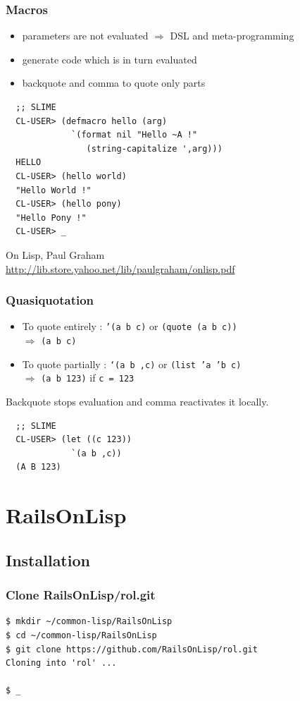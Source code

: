 \documentclass[8pt]{beamer}
\begin{document}
\begin{frame}[fragile]
  \frametitle{Macros}
  \begin{itemize}
    \item parameters are not evaluated $\Rightarrow$ DSL and meta-programming
    \item generate code which is in turn evaluated
    \item backquote and comma to quote only parts
  \end{itemize}
\begin{verbatim}
  ;; SLIME
  CL-USER> (defmacro hello (arg)
             `(format nil "Hello ~A !"
                (string-capitalize ',arg)))
  HELLO
  CL-USER> (hello world)
  "Hello World !"
  CL-USER> (hello pony)
  "Hello Pony !"
  CL-USER> _
\end{verbatim}
  \vspace{1em}
  On Lisp, Paul Graham \\
  \url{http://lib.store.yahoo.net/lib/paulgraham/onlisp.pdf}
\end{frame}

\begin{frame}[fragile]
  \frametitle{Quasiquotation}
  \begin{itemize}
  \item To quote entirely : {\tt '(a b c)} or {\tt (quote (a b c))} \\
    $\Rightarrow$ {\tt (a b c)}
  \item To quote partially : {\tt `(a b ,c)} or {\tt (list 'a 'b c)} \\
    $\Rightarrow$ {\tt (a b 123)} if {\tt c = 123}
  \end{itemize}
  Backquote stops evaluation and comma reactivates it locally.
\begin{verbatim}
  ;; SLIME
  CL-USER> (let ((c 123))
             `(a b ,c))
  (A B 123)
\end{verbatim}
\end{frame}

\section{RailsOnLisp}
\subsection{Installation}

\begin{frame}[fragile]
  \frametitle{Clone RailsOnLisp/rol.git}
\begin{verbatim}
$ mkdir ~/common-lisp/RailsOnLisp
$ cd ~/common-lisp/RailsOnLisp
$ git clone https://github.com/RailsOnLisp/rol.git
Cloning into 'rol' ...

$ _
\end{verbatim}
\end{frame}
\end{document}
